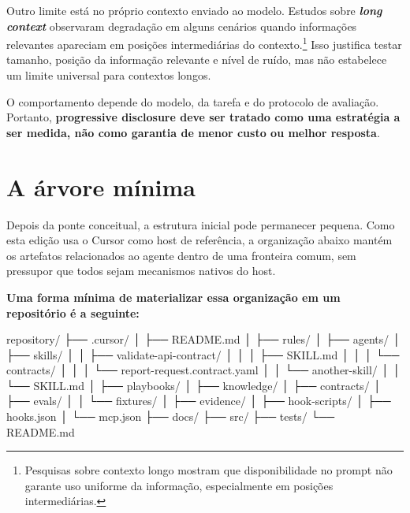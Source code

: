 \documentclass[
  10pt,
  a4paper,
  oneside]{book}
\newenvironment{Shaded}{}{}
\newcommand{\NormalTok}[1]{#1}
\renewenvironment{Shaded}{\begin{snugshade}}{\end{snugshade}}%
\begin{document}
Outro limite está no próprio contexto enviado ao modelo. Estudos sobre
\textbf{\emph{long context}} observaram degradação em alguns cenários
quando informações relevantes apareciam em posições intermediárias do
contexto.\footnote{Pesquisas sobre contexto longo mostram que
  disponibilidade no prompt não garante uso uniforme da informação,
  especialmente em posições intermediárias.} Isso justifica testar
tamanho, posição da informação relevante e nível de ruído, mas não
estabelece um limite universal para contextos longos.

O comportamento depende do modelo, da tarefa e do protocolo de
avaliação. Portanto, \textbf{progressive disclosure deve ser tratado
como uma estratégia a ser medida, não como garantia de menor custo ou
melhor resposta}.

\hypertarget{a-uxe1rvore-muxednima}{%
\section{A árvore mínima}\label{a-uxe1rvore-muxednima}}

Depois da ponte conceitual, a estrutura inicial pode permanecer pequena.
Como esta edição usa o Cursor como host de referência, a organização
abaixo mantém os artefatos relacionados ao agente dentro de uma
fronteira comum, sem pressupor que todos sejam mecanismos nativos do
host.

\textbf{Uma forma mínima de materializar essa organização em um
repositório é a seguinte:}

\begin{Shaded}
\begin{Highlighting}[]
\NormalTok{repository/}
\NormalTok{├── .cursor/}
\NormalTok{│   ├── README.md}
\NormalTok{│   ├── rules/}
\NormalTok{│   ├── agents/}
\NormalTok{│   ├── skills/}
\NormalTok{│   │   ├── validate{-}api{-}contract/}
\NormalTok{│   │   │   ├── SKILL.md}
\NormalTok{│   │   │   └── contracts/}
\NormalTok{│   │   │       └── report{-}request.contract.yaml}
\NormalTok{│   │   └── another{-}skill/}
\NormalTok{│   │       └── SKILL.md}
\NormalTok{│   ├── playbooks/}
\NormalTok{│   ├── knowledge/}
\NormalTok{│   ├── contracts/}
\NormalTok{│   ├── evals/}
\NormalTok{│   │   └── fixtures/}
\NormalTok{│   ├── evidence/}
\NormalTok{│   ├── hook{-}scripts/}
\NormalTok{│   ├── hooks.json}
\NormalTok{│   └── mcp.json}
\NormalTok{├── docs/}
\NormalTok{├── src/}
\NormalTok{├── tests/}
\NormalTok{└── README.md}
\end{Highlighting}
\end{Shaded}
\end{document}
